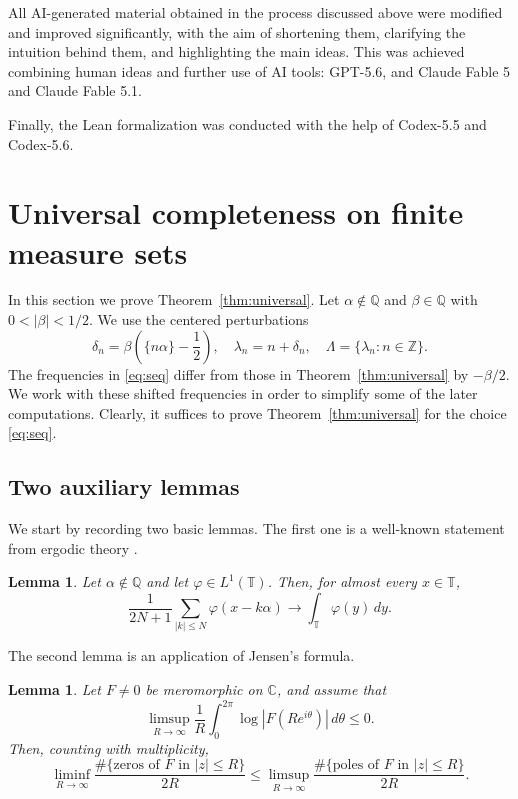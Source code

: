 \documentclass[reqno,a4paper,12pt]{amsart}
\numberwithin{equation}{section}
\newtheorem{lemma}[definition]{Lemma}
\def\Z{{\mathbb Z}}
\def\T{{\mathbb T}}
\def\C{{\mathbb C}}
\def\Q{{\mathbb Q}}
\newcommand\1{\mathds{1}}
\begin{document}
All AI-generated material obtained in the process discussed above were modified and improved significantly, with the aim of shortening them, clarifying the intuition behind them, and highlighting the main ideas. This was achieved combining human ideas and further use of AI tools: GPT-5.6, and Claude Fable 5 and Claude Fable 5.1.

Finally, the Lean formalization was conducted with the help of Codex-5.5 and Codex-5.6.


\section{Universal completeness on finite measure sets}
\label{sec:L1}

In this section we prove Theorem~\ref{thm:universal}. Let
$\alpha\notin\Q$ and $\beta\in\Q$ with $0 < |\beta|<1/2$.
We use the centered perturbations
\begin{equation}\label{eq:seq}
    \delta_n=\beta\left(\{n\alpha\}-\frac12\right),
 \quad \lambda_n=n+\delta_n,\quad \Lambda=\{\lambda_n:n\in\Z\}.
\end{equation}
The frequencies in \eqref{eq:seq} differ from those in
Theorem~\ref{thm:universal} by $-\beta/2$. We work with these shifted frequencies in order to simplify some of the later computations. Clearly, it suffices to prove Theorem~\ref{thm:universal}
for the choice \eqref{eq:seq}.

\subsection{Two auxiliary lemmas}
We start by recording two basic lemmas. The first one is a well-known statement from ergodic theory \cite{Walters1982,EinsiedlerWard2011}. 

\begin{lemma}
\label{lem:two-sided-ergodic}
Let \(\alpha\notin\Q\) and let \(\varphi\in L^1(\T)\). Then, for almost
every \(x\in\T\),
\[
    \frac1{2N+1}\sum_{|k|\leq N}\varphi(x-k\alpha)
    \longrightarrow \int_\T\varphi(y)\,dy.
\]
\end{lemma}

The second lemma is an application of Jensen's formula.

\begin{lemma}
\label{lem:jensen-density-comparison}
Let \(F\neq 0\) be meromorphic on \(\C\), and assume that
\[
 \limsup_{R\to\infty}\frac1R\int_0^{2\pi}\log|F(Re^{i\theta})|\,d\theta
 \leq0.
\]
Then, counting with multiplicity,
\[
 \liminf_{R\to\infty}
 \frac{\#\{\text{zeros of }F\text{ in }|z|\leq R\}}{2R}
 \leq
 \limsup_{R\to\infty}
 \frac{\#\{\text{poles of }F\text{ in }|z|\leq R\}}{2R}.
\]
\end{lemma}
\end{document}
